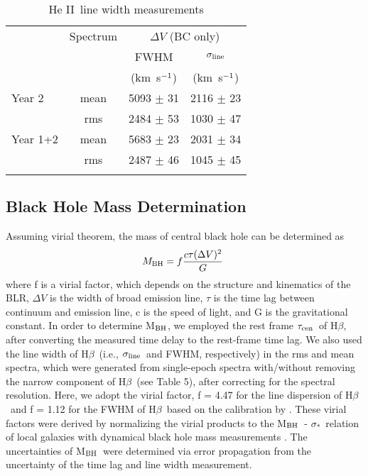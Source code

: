 \documentclass[iop]{emulateapj}
\newcommand{\Hb}{\rm H{$\beta$}}
\newcommand{\HeII}{He {\small II}}
\newcommand{\mbh}{M$_{\rm BH}$}
\newcommand{\kms}{km~s$^{\rm -1}$}
\newcommand{\sigmastar}{$\sigma_{*}$}
\newcommand{\lagcen}{$\tau_{\rm cen}$}
\newcommand{\sigmaline}{$\sigma_{\rm line}$}
\begin{document}
\begin{table}
	\centering
	\caption{\HeII\ line width measurements}
	\begin{tabular}{lccc}
		\tableline\tableline
		&  Spectrum  & \multicolumn{2}{c}{$\Delta V$ (BC only)}  \\
		& & FWHM & \sigmaline \\
		& & (\kms) & (\kms) \\
		\tableline
		Year 2 & mean & 5093 $\pm$ 31 & 2116 $\pm$ 23 \\
		& rms   & 2484 $\pm$ 53 & 1030 $\pm$ 47 \\
		Year 1+2  & mean &  5683 $\pm$ 23 & 2031 $\pm$ 34 \\
		& rms  & 2487 $\pm$ 46 &  1045 $\pm$ 45 \\
		\tableline
	\end{tabular}
	\label{table6}
\end{table}

\subsection{Black Hole Mass Determination}

Assuming virial theorem, the mass of central black hole can be determined as
\begin{equation}\label{eq:mbh}
M_{\rm BH}=f\frac{c \tau ({\Delta V})^2}{G}\ 
\end{equation}
where f is a virial factor, which depends on the structure and kinematics of the BLR, $\Delta V$ is the width of broad emission line, $\tau$ is the time lag between continuum and emission line, c is the speed of light, and G is the gravitational constant. 
In order to determine \mbh, we employed the rest frame \lagcen\ of \Hb, after converting the measured time delay to the rest-frame time lag. We also used the line width of \Hb\ (i.e., \sigmaline\ and FWHM, respectively) in the rms and mean spectra, which were generated from single-epoch spectra with/without removing the narrow component of \Hb\ (see Table 5), after correcting for the spectral resolution. Here, we adopt the virial factor, f = 4.47 for the line dispersion of \Hb\ and f = 1.12 for the FWHM of \Hb\ based on the calibration by \citet{Woo2015}. These virial factors  were derived by normalizing the virial products to the \mbh\ - \sigmastar\ relation of local galaxies with dynamical black hole mass measurements \citep[e.g.,][]{Onken2004,Woo2010,Woo2015,Park2012,Grier2013}. The uncertainties of \mbh\ were determined via error propagation from the uncertainty of the time lag and line width measurement. 
\end{document}

